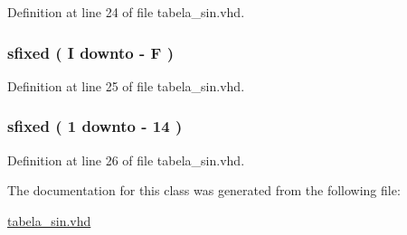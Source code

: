 Definition at line 24 of file tabela\+\_\+sin.\+vhd.

\hypertarget{classtabela__sin_1_1tabela__sin_a1fe5e5a2ba1da85ad8c40a313351a3a5}{}
\subsubsection[{sin}]{ {\bfseries \textcolor{comment}{sfixed}\textcolor{vhdlchar}{ }\textcolor{vhdlchar}{(}\textcolor{vhdlchar}{ }\textcolor{vhdlchar}{ }\textcolor{vhdlchar}{ }\textcolor{vhdlchar}{ }{\bfseries {\bf I}} \textcolor{vhdlchar}{ }\textcolor{keywordflow}{downto}\textcolor{vhdlchar}{ }\textcolor{vhdlchar}{-\/}\textcolor{vhdlchar}{ }\textcolor{vhdlchar}{ }\textcolor{vhdlchar}{ }{\bfseries {\bf F}} \textcolor{vhdlchar}{ }\textcolor{vhdlchar}{)}\textcolor{vhdlchar}{ }} \hspace{0.3cm}{\ttfamily [Signal]}}\label{classtabela__sin_1_1tabela__sin_a1fe5e5a2ba1da85ad8c40a313351a3a5}


Definition at line 25 of file tabela\+\_\+sin.\+vhd.

\hypertarget{classtabela__sin_1_1tabela__sin_a008ca4c78c7dea76719a666c8e8ec3b8}{}
\subsubsection[{va\+\_\+\+Q14}]{ {\bfseries \textcolor{comment}{sfixed}\textcolor{vhdlchar}{ }\textcolor{vhdlchar}{(}\textcolor{vhdlchar}{ }\textcolor{vhdlchar}{ } \textcolor{vhdldigit}{1} \textcolor{vhdlchar}{ }\textcolor{keywordflow}{downto}\textcolor{vhdlchar}{ }\textcolor{vhdlchar}{-\/}\textcolor{vhdlchar}{ } \textcolor{vhdldigit}{14} \textcolor{vhdlchar}{ }\textcolor{vhdlchar}{)}\textcolor{vhdlchar}{ }} \hspace{0.3cm}{\ttfamily [Signal]}}\label{classtabela__sin_1_1tabela__sin_a008ca4c78c7dea76719a666c8e8ec3b8}


Definition at line 26 of file tabela\+\_\+sin.\+vhd.



The documentation for this class was generated from the following file\+:\begin{DoxyCompactItemize}
\item 
\hyperlink{tabela__sin_8vhd}{tabela\+\_\+sin.\+vhd}\end{DoxyCompactItemize}
